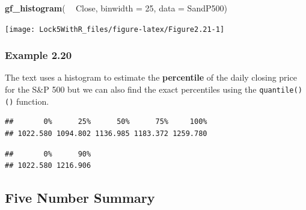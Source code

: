 \documentclass[]{book}
\newenvironment{Shaded}{\begin{snugshade}}{\end{snugshade}}
\newcommand{\DataTypeTok}[1]{\textcolor[rgb]{0.13,0.29,0.53}{#1}}
\newcommand{\DecValTok}[1]{\textcolor[rgb]{0.00,0.00,0.81}{#1}}
\newcommand{\FloatTok}[1]{\textcolor[rgb]{0.00,0.00,0.81}{#1}}
\newcommand{\KeywordTok}[1]{\textcolor[rgb]{0.13,0.29,0.53}{\textbf{#1}}}
\newcommand{\NormalTok}[1]{#1}
\newcommand{\OperatorTok}[1]{\textcolor[rgb]{0.81,0.36,0.00}{\textbf{#1}}}
\newcommand{\StringTok}[1]{\textcolor[rgb]{0.31,0.60,0.02}{#1}}
\begin{document}
\begin{Shaded}
\begin{Highlighting}[]
\KeywordTok{gf_histogram}\NormalTok{( }\OperatorTok{~}\StringTok{ }\NormalTok{Close, }\DataTypeTok{binwidth =} \DecValTok{25}\NormalTok{, }\DataTypeTok{data =}\NormalTok{ SandP500)}
\end{Highlighting}
\end{Shaded}

\texttt{[image: Lock5WithR\_files/figure-latex/Figure2.21-1]}

\hypertarget{example-2.20}{%
\subsubsection{Example 2.20}\label{example-2.20}}

The text uses a histogram to estimate the \textbf{percentile} of the daily closing price for the
S\&P 500 but we can also find the exact percentiles using the \texttt{quantile()()} function.

\begin{Shaded}
\end{Shaded}

\begin{verbatim}
##       0%      25%      50%      75%     100% 
## 1022.580 1094.802 1136.985 1183.372 1259.780
\end{verbatim}

\begin{Shaded}
\end{Shaded}

\begin{verbatim}
##       0%      90% 
## 1022.580 1216.906
\end{verbatim}

\hypertarget{five-number-summary}{%
\subsection{Five Number Summary}\label{five-number-summary}}
\end{document}
